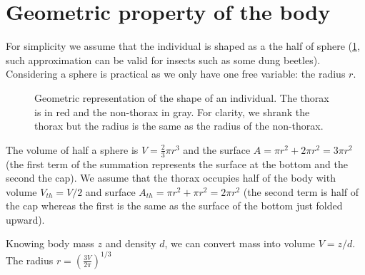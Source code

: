 \documentclass[11pt]{article}
\begin{document}
\section{Geometric property of the body}
For simplicity we assume that the individual is shaped as a the half of sphere (\cref{fig:geo}, such approximation can be valid for insects such as some dung beetles).
Considering a sphere is practical as we only have one free variable:  the radius $r$.
\begin{figure}
\begin{center}
	\caption{Geometric representation of the shape of an individual.
	The thorax is in red and the non-thorax in gray.
	For clarity, we shrank the thorax but the radius is the same as the radius of the non-thorax.
	}
	\label{fig:geo}
\end{center}
\end{figure}
The volume of half a sphere is $V = \frac{2}{3} \pi r^3$ and the surface $A = \pi r^2 + 2 \pi r^ 2 = 3 \pi r^2$ (the first term of the summation represents the surface at the bottom and the second the cap).
We assume that the thorax occupies half of the body with volume $V_{th} = V/2$ and surface $A_{th} = \pi r^2 + \pi r^2 = 2 \pi r^2$ (the second term is half of the cap whereas the first is the same as the surface of the bottom just folded upward).

Knowing body mass $z$ and density $d$, we can convert mass into volume $ V = z/d$.
The radius $r = \left( \frac{3V}{2 \pi} \right)^{1/3}$
\end{document}
